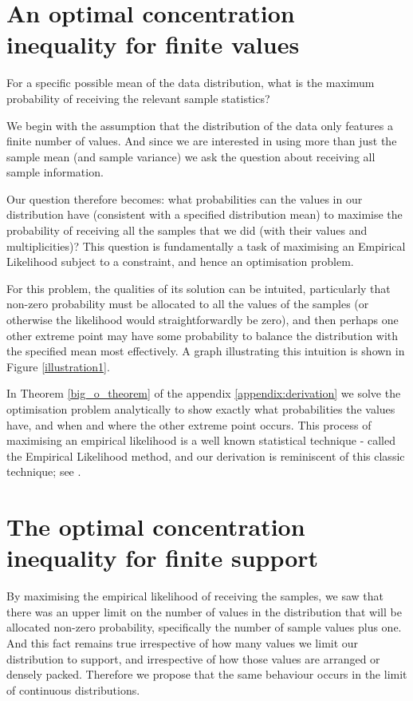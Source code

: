 \documentclass[12pt]{colt2020} %
\begin{document}
\section{An optimal concentration inequality for finite values}\label{sec:the_optimal_bound}

For a specific possible mean of the data distribution, what is the maximum probability of receiving the relevant sample statistics?

We begin with the assumption that the distribution of the data only features a finite number of values. And since we are interested in using more than just the sample mean (and sample variance) we ask the question about receiving all sample information.

Our question therefore becomes: what probabilities can the values in our distribution have (consistent with a specified distribution mean) to maximise the probability of receiving all the samples that we did (with their values and multiplicities)?
This question is fundamentally a task of maximising an Empirical Likelihood subject to a constraint, and hence an optimisation problem.

For this problem, the qualities of its solution can be intuited, particularly that non-zero probability must be allocated to all the values of the samples (or otherwise the likelihood would straightforwardly be zero), and then perhaps one other extreme point may have some probability to balance the distribution with the specified mean most effectively.
A graph illustrating this intuition is shown in Figure \ref{illustration1}.

In Theorem \ref{big_o_theorem} of the appendix \ref{appendix:derivation} we solve the optimisation problem analytically to show exactly what probabilities the values have, and when and where the other extreme point occurs.
This process of maximising an empirical likelihood is a well known statistical technique - called the Empirical Likelihood method, and our derivation is reminiscent of this classic technique; see \cite{10.1093/biomet/75.2.237}.

\section{The optimal concentration inequality for finite support}\label{sec:the_optimal_bound2}

By maximising the empirical likelihood of receiving the samples, we saw that there was an upper limit on the number of values in the distribution that will be allocated non-zero probability, specifically the number of sample values plus one.
And this fact remains true irrespective of how many values we limit our distribution to support, and irrespective of how those values are arranged or densely packed.
Therefore we propose that the same behaviour occurs in the limit of continuous distributions.
\end{document}
